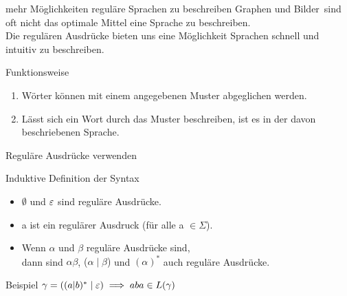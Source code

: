 \begin{frame}[fragile]{mehr Möglichkeiten reguläre Sprachen zu beschreiben}
Graphen und \glqq Bilder\grqq\ sind oft nicht das optimale Mittel eine Sprache zu beschreiben.\\
Die \alert{regulären Ausdrücke} bieten uns eine Möglichkeit Sprachen schnell und intuitiv zu beschreiben.
\begin{alertblock}{Funktionsweise}
\begin{enumerate}
    \item Wörter können mit einem angegebenen Muster abgeglichen werden.
    \item Lässt sich ein Wort durch das Muster beschreiben, ist es in der davon beschriebenen Sprache. 
\end{enumerate}
\end{alertblock}
\end{frame}

\begin{frame}{Reguläre Ausdrücke verwenden}
    \begin{alertblock}{Induktive Definition der Syntax}
    \begin{itemize}
       \item \alert{$\emptyset$} und \alert{$\varepsilon$} sind reguläre Ausdrücke.
       \item \alert{a} ist ein regulärer Ausdruck (für alle a $\in \Sigma$).
       \item Wenn \alert{$\alpha$} und \alert{$\beta$} reguläre Ausdrücke sind,\\dann sind \alert{$\alpha \beta$}, \alert{($\alpha \mid \beta$)} und \alert{$(\alpha)^*$} auch reguläre Ausdrücke.
   \end{itemize}
   \end{alertblock}
   \begin{exampleblock}{Beispiel}
   $\gamma = ((a|b)^* \mid \varepsilon) \implies aba \in L(\gamma)$
   \end{exampleblock}
\end{frame}

